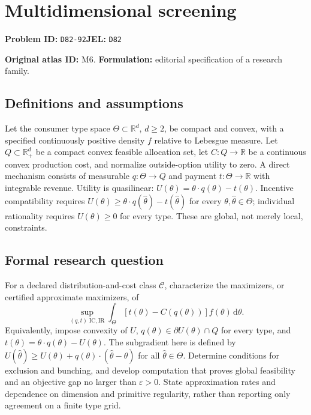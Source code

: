 \documentclass[11pt,a4paper]{article}
\begin{document}
\section*{Multidimensional screening}
\textbf{Problem ID:} \texttt{D82-92}\quad \textbf{JEL:} \texttt{D82}\par
\label{problem:OP-0006}
\label{atlas:prob:M6}

\noindent\textbf{Original atlas ID:} M6. \textbf{Formulation:} editorial specification of a research family.

\subsection*{Definitions and assumptions}

Let the consumer type space $\Theta\subset\mathbb R^d$, $d\ge2$, be compact and convex, with a specified continuously positive density $f$ relative to Lebesgue measure. Let $Q\subset\mathbb R_+^d$ be a compact convex feasible allocation set, let $C:Q\to\mathbb R$ be a continuous convex production cost, and normalize outside-option utility to zero. A direct mechanism consists of measurable $q:\Theta\to Q$ and payment $t:\Theta\to\mathbb R$ with integrable revenue. Utility is quasilinear: $U(\theta)=\theta\cdot q(\theta)-t(\theta)$. Incentive compatibility requires $U(\theta)\ge\theta\cdot q(\hat\theta)-t(\hat\theta)$ for every $\theta,\hat\theta\in\Theta$; individual rationality requires $U(\theta)\ge0$ for every type. These are global, not merely local, constraints.

\subsection*{Formal research question}

For a declared distribution-and-cost class $\mathcal C$, characterize the maximizers, or certified approximate maximizers, of
\[
\sup_{(q,t)\;\mathrm{IC,IR}}\int_\Theta[t(\theta)-C(q(\theta))]f(\theta)\,\mathrm d\theta.
\]
Equivalently, impose convexity of $U$, $q(\theta)\in\partial U(\theta)\cap Q$ for every type, and $t(\theta)=\theta\cdot q(\theta)-U(\theta)$. The subgradient here is defined by $U(\hat\theta)\ge U(\theta)+q(\theta)\cdot(\hat\theta-\theta)$ for all $\hat\theta\in\Theta$. Determine conditions for exclusion and bunching, and develop computation that proves global feasibility and an objective gap no larger than $\varepsilon>0$. State approximation rates and dependence on dimension and primitive regularity, rather than reporting only agreement on a finite type grid.
\end{document}
